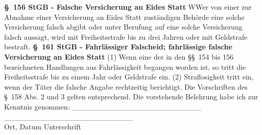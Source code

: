 \newline
\textbf{\S\ 156 StGB - Falsche Versicherung an Eides Statt}\newline
WWer von einer zur Abnahme einer Versicherung an Eides Statt zuständigen Behörde eine solche Versicherung falsch abgibt oder unter Berufung auf eine solche Versicherung falsch aussagt, wird mit Freiheitsstrafe bis zu drei Jahren oder mit Geldstrafe bestraft.\newline
\textbf{\S\ 161 StGB - Fahrlässiger Falscheid; fahrlässige falsche Versicherung an Eides Statt}
(1) Wenn eine der in den \S\S\ 154 bis 156 bezeichneten Handlungen aus Fahrlässigkeit begangen worden ist, so tritt die Freiheitsstrafe bis zu einem Jahr oder Geldstrafe ein.
(2) Straflosigkeit tritt ein, wenn der Täter die falsche Angabe rechtzeitig berichtigt. Die Vorschriften des \S\ 158 Abs. 2 und 3 gelten entsprechend.\newline
\newline
Die vorstehende Belehrung habe ich zur Kenntnis genommen:\newline
\newline
\_\_\_\_\_\_\_\_\_\_\_\_\_\_\_\_\_\_\_\_\_\_\_\_ \hspace{1.5cm} \_\_\_\_\_\_\_\_\_\_\_\_\_\_\_\_\_\_\_\_\_\_\_\_ \\
\small{Ort, Datum}\hspace{5.9cm}
\small{Unterschrift}
